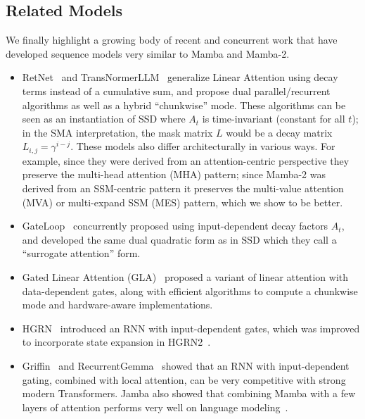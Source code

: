 \documentclass{article}
\newcommand{\citep}{\parencite}
\begin{document}
\subsection{Related Models}
\label{sec:related:concurrent}

We finally highlight a growing body of recent and concurrent work that have developed sequence models very similar to Mamba and Mamba-2.

\begin{itemize}[leftmargin=*,itemsep=0pt,topsep=0pt]
  \item RetNet~\citep{sun2023retentive} and TransNormerLLM~\citep{qin2023transnormerllm} generalize Linear Attention using decay terms instead of a cumulative sum,
    and propose dual parallel/recurrent algorithms as well as a hybrid ``chunkwise'' mode.
    These algorithms can be seen as an instantiation of SSD where $A_t$ is time-invariant (constant for all $t$);
    in the SMA interpretation, the mask matrix $L$ would be a decay matrix $L_{i,j} = \gamma^{i-j}$.
    These models also differ architecturally in various ways.
    For example, since they were derived from an attention-centric perspective they preserve the multi-head attention (MHA) pattern; since Mamba-2 was derived from an SSM-centric pattern it preserves the multi-value attention (MVA) or multi-expand SSM (MES) pattern, which we show to be better\iftoggle{arxiv}{ (\cref{sec:experiments:ablations})}{}.

  \item GateLoop~\citep{katsch2023gateloop} concurrently proposed using input-dependent decay factors $A_t$, and developed the same dual quadratic form as in SSD which they call a ``surrogate attention'' form.

  \item Gated Linear Attention (GLA)~\citep{yang2024gated} proposed a variant of linear attention with data-dependent gates, along with efficient algorithms to compute a chunkwise mode and hardware-aware implementations.

  \item HGRN~\citep{qin2023hierarchically} introduced an RNN with input-dependent gates, which was improved to incorporate state expansion in HGRN2~\citep{qin2024hgrn2}.

  \item Griffin~\citep{de2024griffin} and RecurrentGemma~\citep{botev2024recurrentgemma} showed that an RNN with input-dependent gating, combined with local attention, can be very competitive with strong modern Transformers.
    Jamba also showed that combining Mamba with a few layers of attention performs very well on language modeling~\citep{lieber2024jamba}.


\end{itemize}
\end{document}
